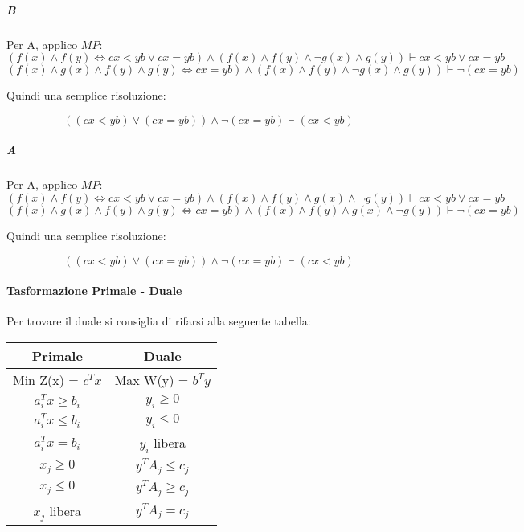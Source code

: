 \subparagraph{B}

Per A, applico $MP$:
\[
    (f(x) \land f(y) \Leftrightarrow cx < yb \lor cx = yb) \land (f(x) \land f(y) \land \neg g(x) \land g(y)) \vdash cx < yb \lor cx = yb
\]
\[
    (f(x) \land g(x) \land f(y) \land g(y) \Leftrightarrow cx = yb) \land (f(x) \land f(y) \land \neg g(x) \land g(y)) \vdash \neg (cx = yb)
\]

Quindi una semplice risoluzione:

\[
    ((cx < yb) \lor (cx = yb)) \land \neg (cx = yb) \vdash (cx < yb)
\]

\subparagraph{A}

Per A, applico $MP$:
\[
    (f(x) \land f(y) \Leftrightarrow cx < yb \lor cx = yb) \land (f(x) \land f(y) \land g(x) \land \neg g(y)) \vdash cx < yb \lor cx = yb
\]
\[
    (f(x) \land g(x) \land f(y) \land g(y) \Leftrightarrow cx = yb) \land (f(x) \land f(y) \land g(x) \land \neg g(y)) \vdash \neg (cx = yb)
\]

Quindi una semplice risoluzione:

\[
    ((cx < yb) \lor (cx = yb)) \land \neg (cx = yb) \vdash (cx < yb)
\]

\paragraph{Tasformazione Primale - Duale}

Per trovare il duale si consiglia di rifarsi alla seguente tabella:

\begin{center}
    \begin{tabular}{||c | c||}
        \hline
        Primale & Duale \\
        \hline
        \hline
        Min Z(x) = $c^Tx$ & Max W(y) = $b^Ty$ \\
        \hline
        $a^T_ix \geq b_i$ & $y_i \geq 0$ \\
        \hline
        $a^T_ix \leq b_i$ & $y_i \leq 0$ \\
        \hline
        $a^T_ix = b_i$ & $y_i$ libera \\
        \hline
        $x_j \geq 0$ & $y^TA_j \leq c_j$ \\
        \hline
        $x_j \leq 0$ & $y^TA_j \geq c_j$ \\
        \hline
        $x_j$ libera & $y^TA_j = c_j$ \\
        \hline
    \end{tabular}
\end{center}

